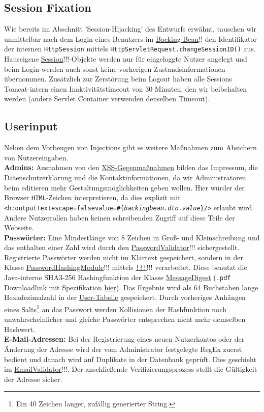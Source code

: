 \documentclass{article}
\begin{document}
\subsection{Session Fixation}
Wie bereits im Abschnitt 'Session-Hijacking' des Entwurfs erwähnt, tauschen wir unmittelbar nach dem Login eines Benutzers im \hyperlink{Login}{Backing-Bean}!! den Identifikator der internen \texttt{HttpSession} mittels \texttt{HttpServletRequest.changeSessionID()}  aus. Hauseigene \hyperlink{Session}{Session}!!!-\hypertarget{safetyfirst}{Objekte} werden nur für eingeloggte Nutzer angelegt und beim Login werden auch sonst keine vorherigen Zustandsinformationen übernommen. Zusätzlich zur Zerstörung beim Logout haben alle Sessions Tomcat-intern einen Inaktivitätstimeout von 30 Minuten, den wir beibehalten werden (andere Servlet Container verwenden denselben Timeout).
\subsection{Userinput}
Neben dem Vorbeugen von \hyperlink{Injections}{Injections} gibt es weitere Maßnahmen zum Absichern von Nutzereingaben.\\
\textbf{Admins:} Ausnahmen von den \hyperlink{XSS}{XSS-Gegenmaßnahmen} bilden das Impressum, die Datenschutzerklärung und  die Kontaktinformationen, da wir Administratoren beim editieren mehr Gestaltungsmöglichkeiten geben wollen. Hier würder der Browser \texttt{HTML}-Zeichen interpretieren, da dies explizit mit \texttt{<h:outputText\hspace{2mm}escape=\dq false\dq\hspace{2mm}value=\dq\#\{\textit{backingbean.dto.value}\}\dq/>} erlaubt wird. Andere Nutzerrollen haben keinen schreibenden Zugriff auf diese Teile der Webseite.\\
\textbf{Passwörter:} Eine Mindestlänge von 8 Zeichen in Groß- und Kleinschreibung und das enthalten einer Zahl wird durch den \hyperlink{Validator}{PasswordValidator}!!! sichergestellt. Registrierte Passwörter werden nicht im Klartext gespeichert, sondern in der Klasse \hyperlink{Hash}{PasswordHashingModule}!!! mittels \hyperlink{}{\texttt{!!!}}!!! verarbeitet. Diese benutzt die Java-interne SHA3-256 Hashingfunktion der Klasse \hyperlink{https://docs.oracle.com/javase/9/docs/api/java/security/MessageDigest.html}{MessageDigest} (\texttt{.pdf} Downloadlink mit Spezifikation \hyperlink{https://nvlpubs.nist.gov/nistpubs/FIPS/NIST.FIPS.202.pdf}{hier}). Das Ergebnis wird als 64 Buchstaben lange Hexadezimalzahl in der \hyperlink{User}{User-Tabelle} gespeichert. Durch vorheriges Anhängen eines Salts\footnote{Ein 40 Zeichen langer, zufällig generierter String.} an das Passwort werden Kollisionen der Hashfunktion noch unwahrscheinlicher und gleiche Passwörter entsprechen nicht mehr demselben Hashwert.\\
\textbf{E-Mail-Adressen:} Bei der Registrierung eines neuen Nutzerkontos oder der Änderung der Adresse wird der vom Administrator festgelegte RegEx zuerst bedient und danach wird auf Duplikate in der Datenbank geprüft. Dies geschieht im \hyperlink{Validator}{EmailValidator}!!!. Der anschließende Verifizierungsprozess stellt die Gültigkeit der Adresse sicher.
\end{document}
